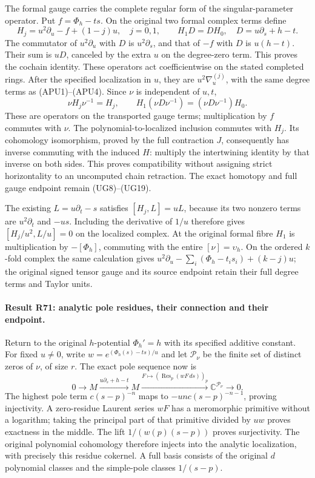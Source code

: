 The formal gauge carries the complete regular form of the
singular-parameter operator. Put \(f=\Phi_h-ts\). On the original
two formal complex terms define
\[
 H_j=u^2\partial_u-f+(1-j)u,\quad j=0,1,\qquad
 H_1D=DH_0,\quad D=u\partial_s+h-t.
\]
The commutator of \(u^2\partial_u\) with \(D\) is
\(u^2\partial_s\), and that of \(-f\) with \(D\) is
\(u(h-t)\). Their sum is \(uD\), canceled by the extra \(u\)
on the degree-zero term. This proves the cochain identity.
These operators act coefficientwise on the stated completed
rings. After the specified localization in \(u\), they are
\(u^2\nabla_u^{(j)}\), with the same degree terms as
(APU1)--(APU4). Since \(\nu\) is independent of \(u,t\),
\[
 \nu H_j\nu^{-1}=H_j,\qquad
 H_1(\nu D\nu^{-1})=(\nu D\nu^{-1})H_0.
\]
These are operators on the transported gauge terms;
multiplication by \(f\) commutes with \(\nu\).
The polynomial-to-localized inclusion commutes with \(H_j\).
Its cohomology isomorphism, proved by the full contraction \(J\),
consequently has inverse commuting with the induced \(H\):
multiply the intertwining identity by that inverse on both
sides. This proves compatibility without assigning strict
horizontality to an uncomputed chain retraction. The exact
homotopy and full gauge endpoint remain (UG8)--(UG19).

The existing \(L=u\partial_t-s\) satisfies
\([H_j,L]=uL\), because its two nonzero terms are
\(u^2\partial_t\) and \(-us\). Including the derivative of
\(1/u\) therefore gives
\([H_j/u^2,L/u]=0\) on the localized complex.
At the original formal fibre \(H_1\) is multiplication by
\(-[\Phi_h]\), commuting with the entire \([\nu]=\upsilon_h\).
On the ordered \(k\)-fold complex the same calculation gives
\(u^2\partial_u-\sum_i(\Phi_h-t_is_i)+(k-j)u\);
the original signed tensor gauge and its source endpoint retain
their full degree terms and Taylor units.


\paragraph{Result R71: analytic pole residues, their connection and their endpoint.}
Return to the original $h$-potential $\Phi_h'=h$ with its
specified additive constant. For fixed $u\ne0$, write
$w=e^{(\Phi_h(s)-ts)/u}$ and let
$\mathcal P_\nu$ be the finite set of distinct zeros of $\nu$,
of size $r$. The exact pole sequence now is
\[
0\longrightarrow M\xrightarrow{u\partial_s+h-t}M
\xrightarrow{F\mapsto(\operatorname{Res}_p(wF\,ds))_p}
\mathbb C^{\mathcal P_\nu}\longrightarrow0.
\]
The highest pole term $c(s-p)^{-n}$ maps to
$-unc(s-p)^{-n-1}$, proving injectivity. A zero-residue
Laurent series $wF$ has a meromorphic primitive without a
logarithm; taking the principal part of that primitive
divided by $uw$ proves exactness in the middle.
The lift $1/(w(p)(s-p))$ proves surjectivity.
The original polynomial cohomology therefore injects into
the analytic localization, with precisely this residue
cokernel. A full basis consists of the original $d$ polynomial
classes and the simple-pole classes $1/(s-p)$.


